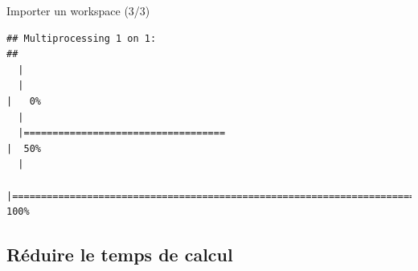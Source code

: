 \documentclass[10pt,xcolor=table,color={dvipsnames,usenames},ignorenonframetext,usepdftitle=false,french]{beamer}
\begin{document}
\begin{frame}[fragile]{Importer un workspace (3/3)}
\begin{verbatim}
## Multiprocessing 1 on 1:
## 
  |                                                                            
  |                                                                      |   0%
  |                                                                            
  |===================================                                   |  50%
  |                                                                            
  |======================================================================| 100%
\end{verbatim}

\end{frame}

\hypertarget{ruxe9duire-le-temps-de-calcul}{%
\subsection{Réduire le temps de
calcul}\label{ruxe9duire-le-temps-de-calcul}}
\end{document}
